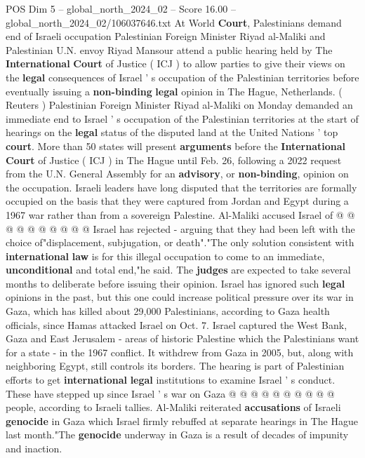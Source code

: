 \begin{textsample}{POS Dim 5 – global\_north\_2024\_02 – Score 16.00 – global\_north\_2024\_02/106037646.txt}  \label{ex:f5_pos_248}
At World \textbf{Court}, Palestinians demand end of Israeli occupation Palestinian Foreign Minister Riyad al-Maliki and Palestinian U.N. envoy Riyad Mansour attend a public hearing held by The \textbf{International} \textbf{Court} of Justice ( ICJ ) to allow parties to give their views on the \textbf{legal} consequences of Israel ' s occupation of the Palestinian territories before eventually issuing a \textbf{non-binding} \textbf{legal} opinion in The Hague, Netherlands. ( Reuters ) Palestinian Foreign Minister Riyad al-Maliki on Monday demanded an immediate end to Israel ' s occupation of the Palestinian territories at the start of hearings on the \textbf{legal} status of the disputed land at the United Nations ' top \textbf{court}.
More than 50 states will present \textbf{arguments} before the \textbf{International} \textbf{Court} of Justice ( ICJ ) in The Hague until Feb. 26, following a 2022 request from the U.N.
General Assembly for an \textbf{advisory}, or \textbf{non-binding}, opinion on the occupation.
Israeli leaders have long disputed that the territories are formally occupied on the basis that they were captured from Jordan and Egypt during a 1967 war rather than from a sovereign Palestine.
Al-Maliki accused Israel of @ @ @ @ @ @ @ @ @ @ Israel has rejected - arguing that they had been left with the choice of"displacement, subjugation, or death"."The only solution consistent with \textbf{international} \textbf{law} is for this illegal occupation to come to an immediate, \textbf{unconditional} and total end,"he said.
The \textbf{judges} are expected to take several months to deliberate before issuing their opinion.
Israel has ignored such \textbf{legal} opinions in the past, but this one could increase political pressure over its war in Gaza, which has killed about 29,000 Palestinians, according to Gaza health officials, since Hamas attacked Israel on Oct. 7.
Israel captured the West Bank, Gaza and East Jerusalem - areas of historic Palestine which the Palestinians want for a state - in the 1967 conflict.
It withdrew from Gaza in 2005, but, along with neighboring Egypt, still controls its borders.
The hearing is part of Palestinian efforts to get \textbf{international} \textbf{legal} institutions to examine Israel ' s conduct.
These have stepped up since Israel ' s war on Gaza @ @ @ @ @ @ @ @ @ @ people, according to Israeli tallies.
Al-Maliki reiterated \textbf{accusations} of Israeli \textbf{genocide} in Gaza which Israel firmly rebuffed at separate hearings in The Hague last month."The \textbf{genocide} underway in Gaza is a result of decades of impunity and inaction.

\end{textsample}
